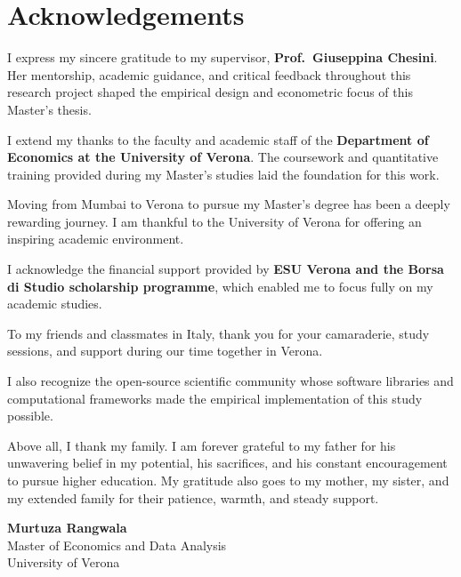 \documentclass[12pt, a4paper]{report}
\begin{document}
\newpage

\chapter*{Acknowledgements}

\begin{singlespace}
\setlength{\parskip}{4pt}

\noindent I express my sincere gratitude to my supervisor, \textbf{Prof.\ Giuseppina Chesini}. Her mentorship, academic guidance, and critical feedback throughout this research project shaped the empirical design and econometric focus of this Master's thesis.

\noindent I extend my thanks to the faculty and academic staff of the \textbf{Department of Economics at the University of Verona}. The coursework and quantitative training provided during my Master's studies laid the foundation for this work.

\noindent Moving from Mumbai to Verona to pursue my Master's degree has been a deeply rewarding journey. I am thankful to the University of Verona for offering an inspiring academic environment.

\noindent I acknowledge the financial support provided by \textbf{ESU Verona and the Borsa di Studio scholarship programme}, which enabled me to focus fully on my academic studies.

\noindent To my friends and classmates in Italy, thank you for your camaraderie, study sessions, and support during our time together in Verona.

\noindent I also recognize the open-source scientific community whose software libraries and computational frameworks made the empirical implementation of this study possible.

\noindent Above all, I thank my family. I am forever grateful to my father for his unwavering belief in my potential, his sacrifices, and his constant encouragement to pursue higher education. My gratitude also goes to my mother, my sister, and my extended family for their patience, warmth, and steady support.

\vspace{0.6cm}

\begin{flushright}
\textbf{Murtuza Rangwala}\\
Master of Economics and Data Analysis\\
University of Verona
\end{flushright}

\end{singlespace}
\end{document}
